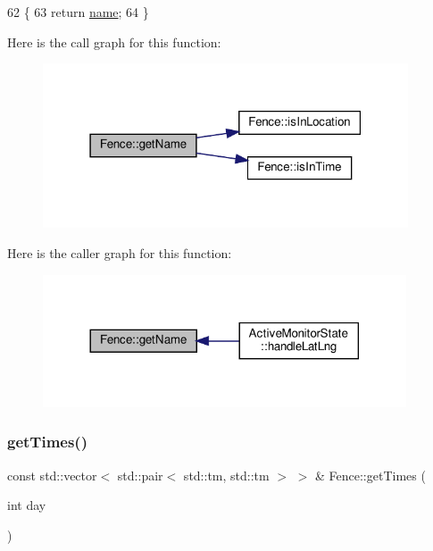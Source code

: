 \begin{DoxyCode}
62 \{
63     \textcolor{keywordflow}{return} \hyperlink{class_fence_aa405676733f25812b38ea0dd9ccd1863}{name};
64 \}
\end{DoxyCode}
Here is the call graph for this function\+:
\nopagebreak
\begin{figure}[H]
\begin{center}
\leavevmode
\includegraphics[width=307pt]{d0/db8/class_fence_a1d90d0ff61bec6cda8240f6365fc5d28_cgraph}
\end{center}
\end{figure}
Here is the caller graph for this function\+:
\nopagebreak
\begin{figure}[H]
\begin{center}
\leavevmode
\includegraphics[width=305pt]{d0/db8/class_fence_a1d90d0ff61bec6cda8240f6365fc5d28_icgraph}
\end{center}
\end{figure}
\mbox{\label{class_fence_a818ee0fcbac0c2f9262a48916a79d73c}} 
\subsubsection{\texorpdfstring{get\+Times()}{getTimes()}}
{\footnotesize\ttfamily const std\+::vector$<$ std\+::pair$<$ std\+::tm, std\+::tm $>$ $>$ \& Fence\+::get\+Times (\begin{DoxyParamCaption}\item[{int}]{day }\end{DoxyParamCaption})}



